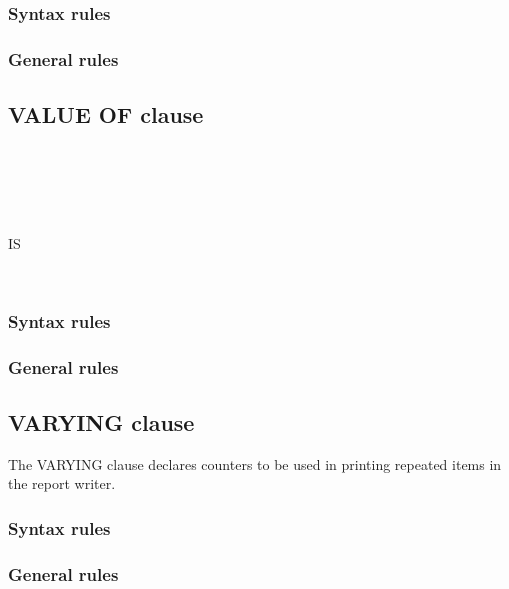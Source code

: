 \subsubsection{Syntax rules}

\subsubsection{General rules}

\subsection{VALUE OF clause}

\begin{syntax}[\deletedcolour]
  \begin{1=}
     \\
  \end{1=}
  \begin{1=}
     \\
     \\
    \identifier
  \end{1=}
  IS
  \begin{1=}
    \literal \\
    \identifier
  \end{1=}
\end{syntax}

\subsubsection{Syntax rules}

\subsubsection{General rules}

\subsection{VARYING clause}

The VARYING clause declares counters to be used in printing repeated items in the report writer.

\begin{syntax}
   \identifier {}   
\end{syntax}

\subsubsection{Syntax rules}

\subsubsection{General rules}

